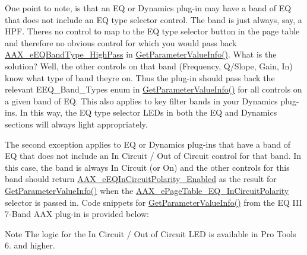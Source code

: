 One point to note, is that an EQ or Dynamics plug-\/in may have a band of EQ that does not include an EQ type selector control. The band is just always, say, a H\+PF. There\textquotesingle{}s no control to map to the EQ type selector button in the page table and therefore no obvious control for which you would pass back \mbox{\hyperlink{a00491_a9ec6da28e827496514bd15d6f2b26d95a7827eec27ad12a8abb7f466c629b6482}{A\+A\+X\+\_\+e\+E\+Q\+Band\+Type\+\_\+\+High\+Pass}} in \mbox{\hyperlink{a01481_a0d3436cb88b4a86fe82a663221a9cfef}{Get\+Parameter\+Value\+Info()}}. What is the solution? Well, the other controls on that band (Frequency, Q/\+Slope, Gain, In) know what type of band they\textquotesingle{}re on. Thus the plug-\/in should pass back the relevant E\+E\+Q\+\_\+\+Band\+\_\+\+Types enum in \mbox{\hyperlink{a01481_a0d3436cb88b4a86fe82a663221a9cfef}{Get\+Parameter\+Value\+Info()}} for all controls on a given band of EQ. This also applies to key filter bands in your Dynamics plug-\/ins. In this way, the EQ type selector L\+E\+Ds in both the EQ and Dynamics sections will always light appropriately.

The second exception applies to EQ or Dynamics plug-\/ins that have a band of EQ that does not include an In Circuit / Out of Circuit control for that band. In this case, the band is always In Circuit (or On) and the other controls for this band should return \mbox{\hyperlink{a00491_ab5bda96f09874705e9b800d1b1495b48aa1f21f2aa320ece14a9259195d3ee2bd}{A\+A\+X\+\_\+e\+E\+Q\+In\+Circuit\+Polarity\+\_\+\+Enabled}} as the result for \mbox{\hyperlink{a01481_a0d3436cb88b4a86fe82a663221a9cfef}{Get\+Parameter\+Value\+Info()}} when the \mbox{\hyperlink{a00491_aa169208a2ce713fa021e20deb2eaf608ac5a06a293b7706191d3371813c47e999}{A\+A\+X\+\_\+e\+Page\+Table\+\_\+\+E\+Q\+\_\+\+In\+Circuit\+Polarity}} selector is passed in. Code snippets for \mbox{\hyperlink{a01481_a0d3436cb88b4a86fe82a663221a9cfef}{Get\+Parameter\+Value\+Info()}} from the EQ I\+II 7-\/Band A\+AX plug-\/in is provided below\+:

\begin{DoxyNote}{Note}
The logic for the In Circuit / Out of Circuit L\+ED is available in Pro Tools 6. and higher.
\end{DoxyNote}


